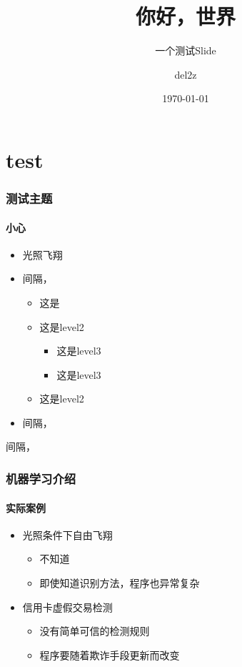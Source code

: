 \documentclass[zh]{slide}
\begin{document}
\title{你好，世界}
\subtitle{\longdash 一个测试Slide}
\author[del2z]{del2z}
\date{\today}

\begin{frame}
\titlepage
\end{frame}

\section{test}
\begin{frame}
\frametitle{测试主题}
\framesubtitle{小心}

\begin{itemize}
  \item<1-> 光照飞翔 \\
  \item<2-> 间隔\the\itemsep，\\
  \begin{itemize}
    \item 这是\the\itemsep
    \item 这是level2 \\
    \begin{itemize}
      \item 这是level3
      \item 这是level3
    \end{itemize}
    \item 这是level2
  \end{itemize}
  \item<2-> 间隔\the\itemsep，
  \end{itemize}
  间隔\the\itemsep，
\end{frame}

\begin{frame}
\frametitle{机器学习介绍}
\framesubtitle{实际案例}

\begin{itemize}
  \item<1-> 光照{条件下自由}飞翔 \\
  \begin{itemize}
    \item 不知道\the\itemsep
    \item 即使知道识别方法，程序也异常复杂
  \end{itemize}
  \item<2-> 信用卡虚假交易检测
  \begin{itemize}
    \item 没有简单可信的检测规则
    \item 程序要随着欺诈手段更新而改变
  \end{itemize}
\end{itemize}
\end{frame}
\end{document}
